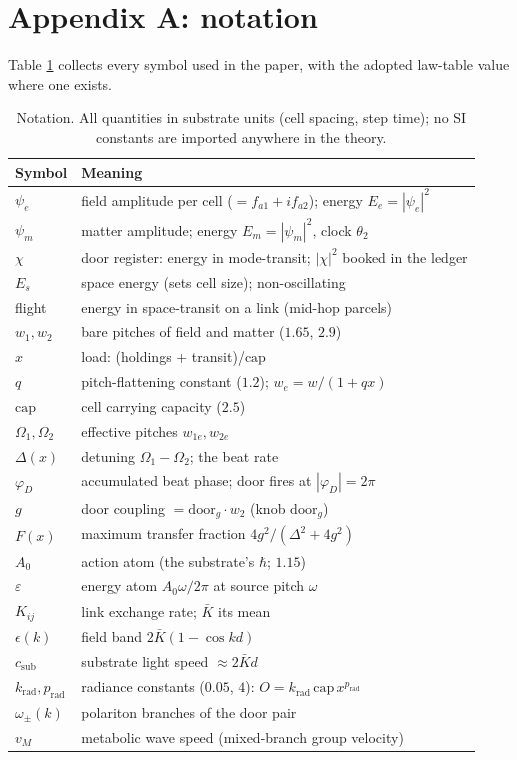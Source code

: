\section{Appendix A: notation}\label{appendix-a-notation}

Table \ref{tab:notation} collects every symbol used in the paper, with
the adopted law-table value where one exists.

\begin{table}[h]
\centering
\small
\begin{tabular}{p{1.5cm} p{6.0cm}}
\hline
\textbf{Symbol} & \textbf{Meaning} \\
\hline
$\psi_e$ & field amplitude per cell ($=f_{a1}+i f_{a2}$); energy $E_e = |\psi_e|^2$ \\
$\psi_m$ & matter amplitude; energy $E_m = |\psi_m|^2$, clock $\theta_2$ \\
$\chi$ & door register: energy in mode-transit; $|\chi|^2$ booked in the ledger \\
$E_s$ & space energy (sets cell size); non-oscillating \\
flight & energy in space-transit on a link (mid-hop parcels) \\
$w_1, w_2$ & bare pitches of field and matter ($1.65$, $2.9$) \\
$x$ & load: (holdings + transit)/$\mathrm{cap}$ \\
$q$ & pitch-flattening constant ($1.2$); $w_{e} = w/(1+qx)$ \\
$\mathrm{cap}$ & cell carrying capacity ($2.5$) \\
$\Omega_1, \Omega_2$ & effective pitches $w_{1e}, w_{2e}$ \\
$\Delta(x)$ & detuning $\Omega_1 - \Omega_2$; the beat rate \\
$\varphi_D$ & accumulated beat phase; door fires at $|\varphi_D| = 2\pi$ \\
$g$ & door coupling $= \mathrm{door}_g \cdot w_2$ (knob $\mathrm{door}_g$) \\
$F(x)$ & maximum transfer fraction $4g^2/(\Delta^2 + 4g^2)$ \\
$A_0$ & action atom (the substrate's $\hbar$; $1.15$) \\
$\varepsilon$ & energy atom $A_0\omega/2\pi$ at source pitch $\omega$ \\
$K_{ij}$ & link exchange rate; $\bar K$ its mean \\
$\epsilon(k)$ & field band $2\bar K(1 - \cos kd)$ \\
$c_{\mathrm{sub}}$ & substrate light speed $\approx 2\bar K d$ \\
$k_{\mathrm{rad}}, p_{\mathrm{rad}}$ & radiance constants ($0.05$, $4$): $O = k_{\mathrm{rad}}\,\mathrm{cap}\,x^{p_{\mathrm{rad}}}$ \\
$\omega_\pm(k)$ & polariton branches of the door pair \\
$v_M$ & metabolic wave speed (mixed-branch group velocity) \\
\hline
\end{tabular}
\caption{Notation. All quantities in substrate units (cell spacing, step
time); no SI constants are imported anywhere in the theory.}
\label{tab:notation}
\end{table}

